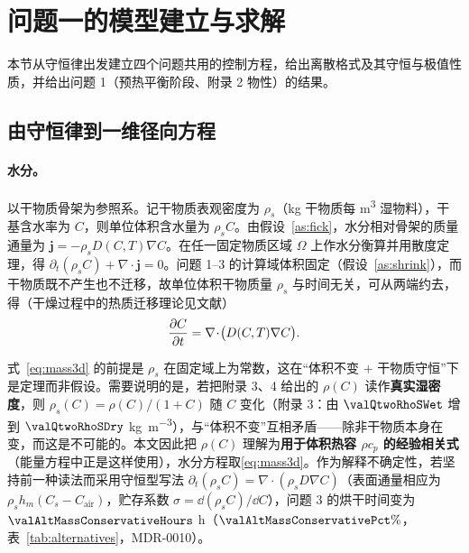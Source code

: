 \section{问题一的模型建立与求解}
\label{sec:q1}

本节从守恒律出发建立四个问题共用的控制方程，给出离散格式及其守恒与极值性质，并给出问题 1（预热平衡阶段、附录 2 物性）的结果。

\subsection{由守恒律到一维径向方程}
\label{subsec:governing}

\paragraph{水分。} 以干物质骨架为参照系。记干物质表观密度为 $\rho_s$（\si{\kilo\gram} 干物质每 \si{\cubic\meter} 湿物料），干基含水率为 $C$，则单位体积含水量为 $\rho_sC$。由假设~\ref{as:fick}，水分相对骨架的质量通量为 $\bm j=-\rho_sD(C,T)\nabla C$。在任一固定物质区域 $\Omega$ 上作水分衡算并用散度定理，得 $\partial_t(\rho_sC)+\nabla\!\cdot\!\bm j=0$。问题 1--3 的计算域体积固定（假设~\ref{as:shrink}），而干物质既不产生也不迁移，故单位体积干物质量 $\rho_s$ 与时间无关，可从两端约去，得（干燥过程中的热质迁移理论见文献\cite{luikov1966,mujumdar2014}）
\begin{equation}
\frac{\partial C}{\partial t}=\nabla\!\cdot\!\bigl(D(C,T)\nabla C\bigr).
\label{eq:mass3d}
\end{equation}

\begin{remark}\label{rem:massform}
式~\eqref{eq:mass3d} 的前提是 $\rho_s$ 在固定域上为常数，这在“体积不变 $+$ 干物质守恒”下是定理而非假设。需要说明的是，若把附录 3、4 给出的 $\rho(C)$ 读作\textbf{真实湿密度}，则 $\rho_s(C)=\rho(C)/(1+C)$ 随 $C$ 变化（附录 3：由 $\valQtwoRhoSWet$ 增到 $\valQtwoRhoSDry$ \si{\kilo\gram\per\cubic\meter}），与“体积不变”互相矛盾——除非干物质本身在变，而这是不可能的。本文因此把 $\rho(C)$ 理解为\textbf{用于体积热容 $\rho c_p$ 的经验相关式}（能量方程中正是这样使用），水分方程取\eqref{eq:mass3d}。作为解释不确定性，若坚持前一种读法而采用守恒型写法
$\partial_t(\rho_sC)=\nabla\!\cdot\!(\rho_sD\nabla C)$（表面通量相应为 $\rho_sh_m(C_s-C_{\mathrm{air}})$，贮存系数 $\sigma=\dd(\rho_sC)/\dd C$），问题 3 的烘干时间变为 $\valAltMassConservativeHours$ h（$\valAltMassConservativePct\%$，表~\ref{tab:alternatives}，MDR-0010）。
\end{remark}


